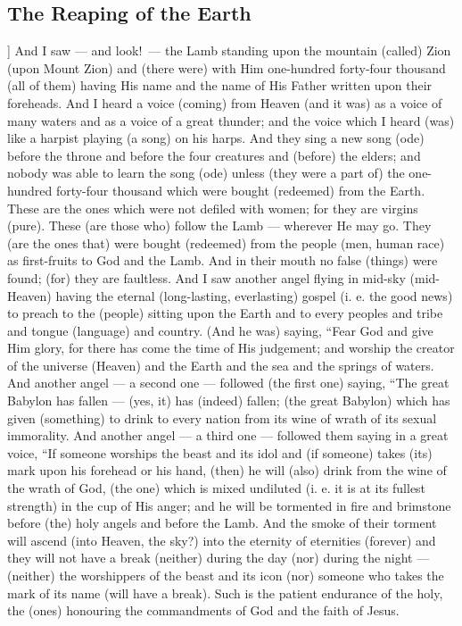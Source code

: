 \begin{pages}
\begin{Leftside}
        			\chapter{The Reaping of the Earth}
				]		
		And I saw — and look! — the Lamb standing upon the mountain (called) Zion (upon Mount Zion) and (there were) with Him one-hundred forty-four thousand (all of them) having His name and the name of His Father written upon their foreheads. And I heard a voice (coming) from Heaven (and it was) as a voice of many waters and as a voice of a great thunder; and the voice which I heard (was) like a harpist playing (a song) on his harps.  
		\pend
		\pstart
		And they sing a new song (ode) before the throne and before the four creatures and (before) the elders; and nobody was able to learn the song (ode) unless (they were a part of) the one-hundred forty-four thousand which were bought (redeemed) from the Earth. These are the ones which were not defiled with women; for they are virgins (pure). These (are those who) follow the Lamb — wherever He may go. They (are the ones that) were bought (redeemed) from the people (men, human race) as first-fruits to God and the Lamb. And in their mouth no false (things) were found; (for) they are faultless. 
		\pend
		\pstart
		And I saw another angel flying in mid-sky (mid-Heaven) having the eternal (long-lasting, everlasting) gospel (i. e. the good news) to preach to the (people) sitting upon the Earth and to every peoples and tribe and tongue (language) and country. (And he was) saying, “Fear God and give Him glory, for there has come the time of His judgement; and worship the creator of the universe (Heaven) and the Earth and the sea and the springs of waters. 
		\pend
		\pstart
		And another angel — a second one — followed (the first one) saying, “The great Babylon has fallen — (yes, it) has (indeed) fallen; (the great Babylon) which has given (something) to drink to every nation from its wine of wrath of its sexual immorality. 
		\pend
		\pstart
		And another angel — a third one — followed them saying in a great voice, “If someone worships the beast and its idol and (if someone) takes (its) mark upon his forehead or his hand, (then) he will (also) drink from the wine of the wrath of God, (the one) which is mixed undiluted (i. e. it is at its fullest strength) in the cup of His anger; and he will be tormented in fire and brimstone before (the) holy angels and before the Lamb. 
		\pend
		\pstart
		And the smoke of their torment will ascend (into Heaven, the sky?) into the eternity of eternities (forever) and they will not have a break (neither) during the day (nor) during the night — (neither) the worshippers of the beast and its icon (nor) someone who takes the mark of its name (will have a break). Such is the patient endurance of the holy, the (ones) honouring the commandments of God and the faith of Jesus. 

\end{Leftside}
\end{pages}
